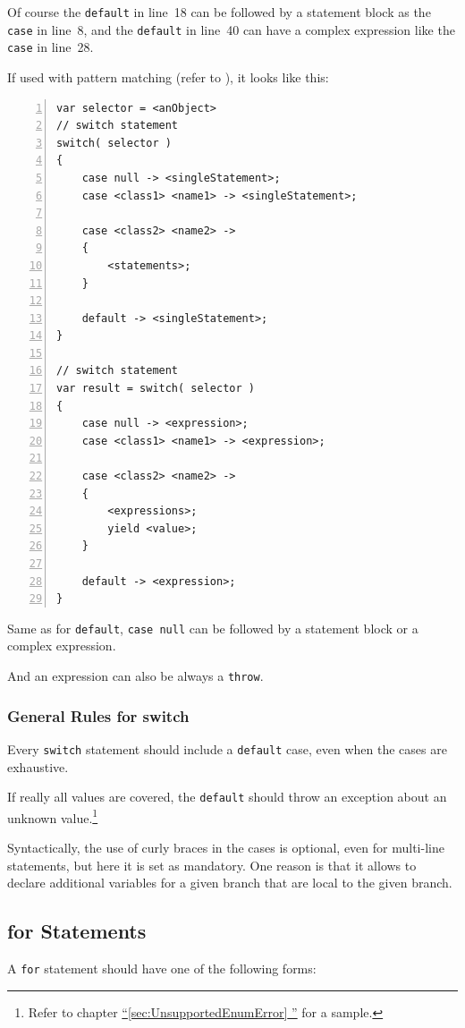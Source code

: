 \documentclass[12pt,a4paper,titlepage, parskip=half, headsepline, footsepline, cleardoubleplain]{scrbook}
\newcommand*{\tqfullref}[1]{\hyperref[{#1}]{“\ref*{#1} \nameref*{#1}”}}
\begin{document}
Of course the \lstinline|default| in line~18 can be followed by a statement block as the \lstinline|case| in line~8, and the \lstinline|default| in line~40 can have a complex expression like the \lstinline|case| in line~28.

If used with pattern matching (refer to \autocite{ORACLE_DOC_PATTERNMATCHING}), it looks like this:

\begin{lstlisting}[numbers=left]
var selector = <anObject>
// switch statement
switch( selector )
{
    case null -> <singleStatement>;
    case <class1> <name1> -> <singleStatement>;

    case <class2> <name2> ->
    {
        <statements>;
    }

    default -> <singleStatement>;
}

// switch statement
var result = switch( selector )
{
    case null -> <expression>;
    case <class1> <name1> -> <expression>;

    case <class2> <name2> ->
    {
        <expressions>;
        yield <value>;
    }

    default -> <expression>;
}
\end{lstlisting}

Same as for \lstinline|default|, \lstinline|case null| can be followed by a statement block or a complex expression.

And an expression can also be always a \lstinline|throw|.

\subsubsection{General Rules for switch}
Every \lstinline|switch| statement should include a \lstinline|default| case, even when the cases are exhaustive.

If really all values are covered, the \lstinline|default| should throw an exception about an unknown value.\footnote{Refer to chapter \tqfullref{sec:UnsupportedEnumError} for a sample.}

Syntactically, the use of curly braces in the cases is optional, even for multi-line statements, but here it is set as mandatory. One reason is that it allows to declare additional variables for a given branch that are local to the given branch.

\subsection{for Statements}
A \lstinline|for| statement should have one of the following forms:
\end{document}
